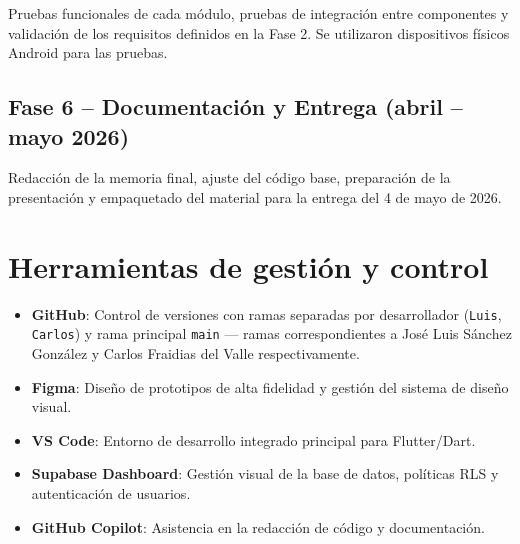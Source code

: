 Pruebas funcionales de cada módulo, pruebas de integración entre componentes y validación de los requisitos definidos en la Fase 2. Se utilizaron dispositivos físicos Android para las pruebas.

\subsection{Fase 6 -- Documentación y Entrega (abril -- mayo 2026)}

Redacción de la memoria final, ajuste del código base, preparación de la presentación y empaquetado del material para la entrega del 4 de mayo de 2026.

\section{Herramientas de gestión y control}

\begin{itemize}
  \item \textbf{GitHub}: Control de versiones con ramas separadas por desarrollador (\texttt{Luis}, \texttt{Carlos}) y rama principal \texttt{main} — ramas correspondientes a José Luis Sánchez González y Carlos Fraidias del Valle respectivamente.
  \item \textbf{Figma}: Diseño de prototipos de alta fidelidad y gestión del sistema de diseño visual.
  \item \textbf{VS Code}: Entorno de desarrollo integrado principal para Flutter/Dart.
  \item \textbf{Supabase Dashboard}: Gestión visual de la base de datos, políticas RLS y autenticación de usuarios.
  \item \textbf{GitHub Copilot}: Asistencia en la redacción de código y documentación.
\end{itemize}

